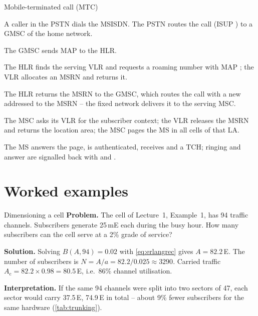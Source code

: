\documentclass[11pt,a4paper]{article}
\begin{document}
\begin{acnfigure}
  \caption{Mobile-originated call (\cref{proc:moc}).}
  \label{fig:moc}
\end{acnfigure}

\begin{procedurebox}{Mobile-terminated call (MTC)}\label{proc:mtc}
\begin{steps}
  \item A caller in the PSTN dials the MSISDN. The PSTN routes the call (ISUP ) to a
        GMSC of the home network.
  \item The GMSC sends MAP  to the HLR.
  \item The HLR finds the serving VLR and requests a roaming number with MAP
        ; the VLR allocates an MSRN and returns it.
  \item The HLR returns the MSRN to the GMSC, which routes the call with a new 
        addressed to the MSRN -- the fixed network delivers it to the serving MSC.
  \item The MSC asks its VLR for the subscriber context; the VLR releases the MSRN and
        returns the location area; the MSC pages the MS in all cells of that LA.
  \item The MS answers the page, is authenticated, receives  and a TCH; ringing
        and answer are signalled back with  and .
\end{steps}
\end{procedurebox}

\begin{acnfigure}
  \caption{Mobile-terminated call: HLR interrogation, MSRN allocation, routing and paging
  (\cref{proc:mtc}). Dashed: signalling; solid: the reserved circuit.}
  \label{fig:mtc}
\end{acnfigure}

\section{Worked examples}

\begin{examplebox}{Dimensioning a cell}\label{ex:dim}
\textbf{Problem.} The cell of Lecture~1, Example~1, has 94 traffic channels. Subscribers
generate 25\,mE each during the busy hour. How many subscribers can the cell serve at a
2\% grade of service?

\textbf{Solution.} Solving $B(A,94) = 0.02$ with \cref{eq:erlangrec} gives
$A = 82.2$\,E. The number of subscribers is $N = A/a = 82.2/0.025 \approx 3290$.
Carried traffic $A_{\mathrm{c}} = 82.2\times0.98 = 80.5$\,E, i.e.\ 86\% channel utilisation.

\textbf{Interpretation.} If the same 94 channels were split into two sectors of 47, each
sector would carry 37.5\,E, 74.9\,E in total -- about 9\% fewer subscribers for the same
hardware (\cref{tab:trunking}).
\end{examplebox}
\end{document}
